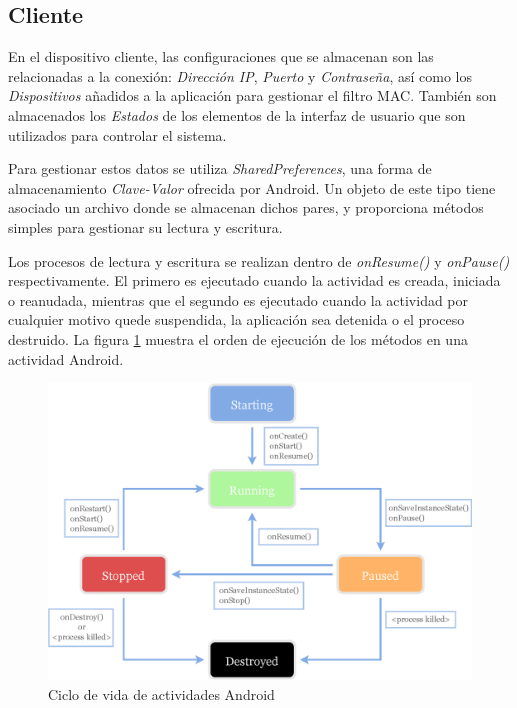 \documentclass[12pt]{article}
\begin{document}
    \subsection{Cliente}
        En el dispositivo cliente, las configuraciones que se almacenan son las relacionadas a la conexión: \textit{Dirección IP}, \textit{Puerto} y \textit{Contraseña}, así como los \textit{Dispositivos} añadidos a la aplicación para gestionar el filtro MAC. También son almacenados los \textit{Estados} de los elementos de la interfaz de usuario que son utilizados para controlar el sistema.

        Para gestionar estos datos se utiliza \textit{SharedPreferences}, una forma de almacenamiento \textit{Clave-Valor} ofrecida por Android. Un objeto de este tipo tiene asociado un archivo donde se almacenan dichos pares, y proporciona métodos simples para gestionar su lectura y escritura.
        
        Los procesos de lectura y escritura se realizan dentro de \textit{onResume()} y \textit{onPause()} respectivamente. El primero es ejecutado cuando la actividad es creada, iniciada o reanudada, mientras que el segundo es ejecutado cuando la actividad por cualquier motivo quede suspendida, la aplicación sea detenida o el proceso destruido. La figura \ref{fig:android_lifecycle} muestra el orden de ejecución de los métodos en una actividad Android.
        
        \begin{figure}[h!]
            \centering
                \includegraphics[scale=0.7]{android_lifecycle.eps}
                \caption{Ciclo de vida de actividades Android}
                \label{fig:android_lifecycle}
        \end{figure}
\end{document}
